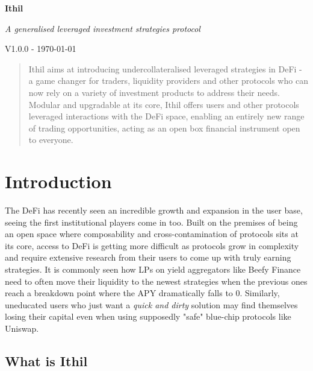 \documentclass[a4paper,10 pt]{article}
\theoremstyle{definition}
\begin{document}
\begin{titlepage}
    \begin{center}
        \vspace*{1cm}
            
        \Huge
        \textbf{Ithil}

        \vspace{0.5cm}
        \Large
        {\it A generalised leveraged investment strategies protocol}

        \vspace{1.5cm}
        {\normalsize V1.0.0 - \today}
        \vspace{1.0cm}

        \begin{abstract}
        Ithil aims at introducing undercollateralised leveraged strategies in DeFi - a game changer for traders, liquidity providers and other protocols who can now rely on a variety of investment products to address their needs. Modular and upgradable at its core, Ithil offers users and other protocols leveraged interactions with the DeFi space, enabling an entirely new range of trading opportunities, acting as an open box financial instrument open to everyone.
        \end{abstract}
            
    \end{center}
\end{titlepage}

\section{Introduction}

The DeFi has recently seen an incredible growth and expansion in the user base, seeing the first institutional players come in too. Built on the premises of being an open space where composability and cross-contamination of protocols sits at its core, access to DeFi is getting more difficult as protocols grow in complexity and require extensive research from their users to come up with truly earning strategies. It is commonly seen how LPs on yield aggregators like Beefy Finance need to often move their liquidity to the newest strategies when the previous ones reach a breakdown point where the APY dramatically falls to 0. Similarly, uneducated users who just want a {\it quick and dirty} solution may find themselves losing their capital even when using supposedly "safe" blue-chip protocols like Uniswap.

\subsection{What is Ithil}
\end{document}
